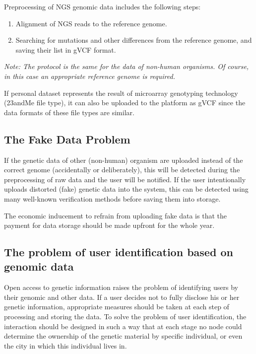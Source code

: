 Preprocessing of NGS genomic data includes the following steps:
\begin{enumerate}
  \item Alignment of NGS reads to the reference genome.
  \item Searching for mutations and other differences from the reference genome, and saving their list in gVCF format.
\end{enumerate}

\begin{note} \it
  Note: The protocol is the same for the data of non-human organisms. Of course, in this case an appropriate reference genome is required.
\end{note}

If personal dataset represents the result of microarray genotyping technology (23andMe file type), it can also be uploaded to the platform as gVCF since the data formats of these file types are similar.

\subsection{The Fake Data Problem}

If the genetic data of other (non-human) organism are uploaded instead of the correct genome (accidentally or deliberately), this will be detected during the preprocessing of raw data and the user will be notified.
If the user intentionally uploads distorted (fake) genetic data into the system, this can be detected using many well-known verification methods before saving them into storage.

\begin{note}
  The economic inducement to refrain from uploading fake data is that the payment for data storage should be made upfront for the whole year.
\end{note}

\subsection{The problem of user identification based on genomic data}

Open access to genetic information raises the problem of identifying users by their genomic and other data. If a user decides not to fully disclose his or her genetic information, appropriate measures should be taken at each step of processing and storing the data.
To solve the problem of user identification, the interaction should be designed in such a way that at each stage no node could determine the ownership of the genetic material by specific individual, or even the city in which this individual lives in.

